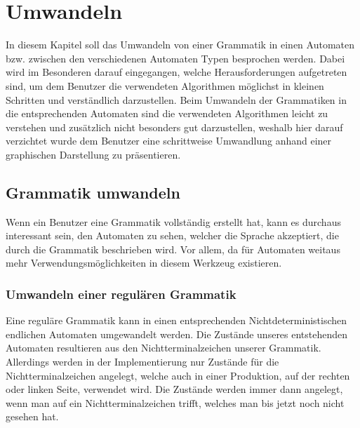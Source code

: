 

\chapter{Umwandeln}\label{ConverTo}

In diesem Kapitel soll das Umwandeln von einer Grammatik in einen Automaten
bzw. zwischen den verschiedenen Automaten Typen besprochen werden. Dabei wird
im Besonderen darauf eingegangen, welche Herausforderungen aufgetreten sind, um
dem Benutzer die verwendeten Algorithmen möglichst in kleinen Schritten und
verständlich darzustellen. Beim Umwandeln der Grammatiken in die entsprechenden
Automaten sind die verwendeten Algorithmen leicht zu verstehen und zusätzlich
nicht besonders gut darzustellen, weshalb hier darauf verzichtet wurde dem
Benutzer eine schrittweise Umwandlung anhand einer graphischen Darstellung zu
präsentieren.\vspace{10pt}


\section{Grammatik umwandeln}\label{ConverToGrammar}

Wenn ein Benutzer eine Grammatik vollständig erstellt hat, kann es durchaus
interessant sein, den Automaten zu sehen, welcher die Sprache akzeptiert, die
durch die Grammatik beschrieben wird. Vor allem, da für Automaten weitaus mehr
Verwendungsmöglichkeiten in diesem Werkzeug existieren.\vspace{10pt}

\subsection{Umwandeln einer regulären Grammatik}\label{ConverToGrammarRegular}

Eine reguläre Grammatik kann in einen entsprechenden Nichtdeterministischen
endlichen Automaten umgewandelt werden. Die Zustände unseres entstehenden
Automaten resultieren aus den Nichtterminalzeichen unserer Grammatik. Allerdings
werden in der Implementierung nur Zustände für die Nichtterminalzeichen angelegt,
welche auch in einer Produktion, auf der rechten oder linken Seite, verwendet
wird. Die Zustände werden immer dann angelegt, wenn man auf ein
Nichtterminalzeichen trifft, welches man bis jetzt noch nicht gesehen
hat.\vspace{10pt}


